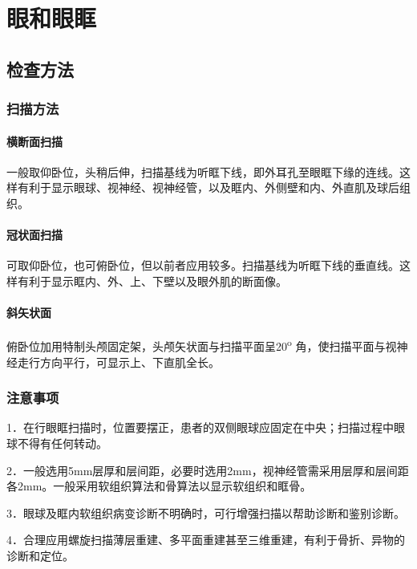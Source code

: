 \chapter{眼和眼眶}

\section{检查方法}

\subsection{扫描方法}

\subsubsection{横断面扫描}

一般取仰卧位，头稍后伸，扫描基线为听眶下线，即外耳孔至眼眶下缘的连线。这样有利于显示眼球、视神经、视神经管，以及眶内、外侧壁和内、外直肌及球后组织。

\subsubsection{冠状面扫描}

可取仰卧位，也可俯卧位，但以前者应用较多。扫描基线为听眶下线的垂直线。这样有利于显示眶内、外、上、下壁以及眼外肌的断面像。

\subsubsection{斜矢状面}

俯卧位加用特制头颅固定架，头颅矢状面与扫描平面呈20\textsuperscript{o}
角，使扫描平面与视神经走行方向平行，可显示上、下直肌全长。

\subsection{注意事项}

1．在行眼眶扫描时，位置要摆正，患者的双侧眼球应固定在中央；扫描过程中眼球不得有任何转动。

2．一般选用5mm层厚和层间距，必要时选用2mm，视神经管需采用层厚和层间距各2mm。一般采用软组织算法和骨算法以显示软组织和眶骨。

3．眼球及眶内软组织病变诊断不明确时，可行增强扫描以帮助诊断和鉴别诊断。

4．合理应用螺旋扫描薄层重建、多平面重建甚至三维重建，有利于骨折、异物的诊断和定位。


